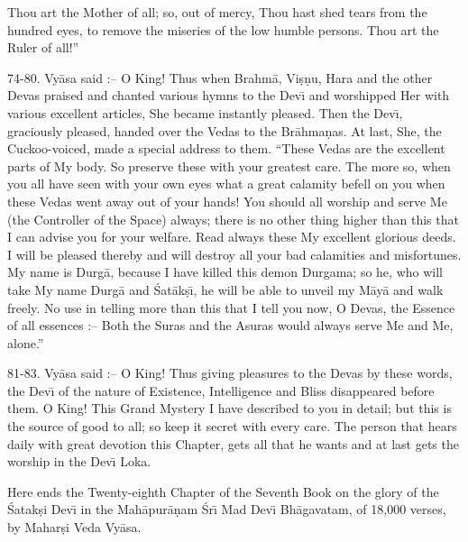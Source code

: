 Thou art the Mother of all; so, out of mercy, Thou hast shed tears from the hundred eyes, to remove the miseries of the low humble persons. Thou art the Ruler of all!''

74-80. Vy\=asa said :-- O King! Thus when Brahm\=a, Vi\d{s}\d{n}u, Hara and the other Devas praised and chanted various hymns to the Dev\={\i} and worshipped Her with various excellent articles, She became instantly pleased. Then the Dev\={\i}, graciously pleased, handed over the Vedas to the Br\=ahma\d{n}as. At last, She, the Cuckoo-voiced, made a special address to them. ``These Vedas are the excellent parts of My body. So preserve these with your greatest care. The more so, when you all have seen with your own eyes what a great calamity befell on you when these Vedas went away out of your hands! You should all worship and serve Me (the Controller of the Space) always; there is no other thing higher than this that I can advise you for your welfare. Read always these My excellent glorious deeds. I will be pleased thereby and will destroy all your bad calamities and misfortunes. My name is Durg\=a, because I have killed this demon Durgama; so he, who will take My name Durg\=a and \'Sat\=ak\d{s}\={\i}, he will be able to unveil my M\=ay\=a and walk freely. No use in telling more than this that I tell you now, O Devas, the Essence of all essences :-- Both the Suras and the Asuras would always serve Me and Me, alone.''

81-83. Vy\=asa said :-- O King! Thus giving pleasures to the Devas by these words, the Dev\={\i} of the nature of Existence, Intelligence and Bliss disappeared before them. O King! This Grand Mystery I have described to you in detail; but this is the source of good to all; so keep it secret with every care. The person that hears daily with great devotion this Chapter, gets all that he wants and at last gets the worship in the Dev\={\i} Loka.

Here ends the Twenty-eighth Chapter of the Seventh Book on the glory of the \'Satak\d{s}i Dev\={\i} in the Mah\=apur\=a\d{n}am \'Sr\={\i} Mad Dev\={\i} Bh\=agavatam, of 18,000 verses, by Mahar\d{s}i Veda Vy\=asa.




